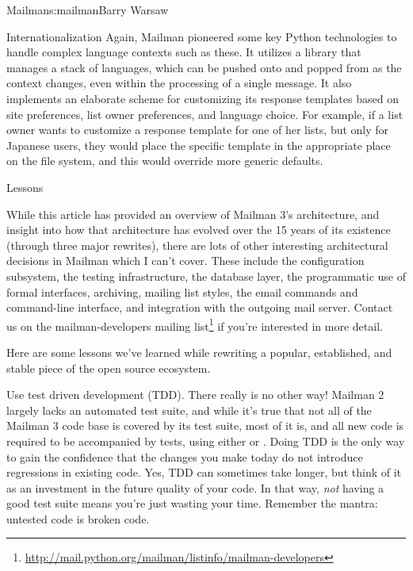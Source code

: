 \begin{aosachapter}{Mailman}{s:mailman}{Barry Warsaw}
\begin{aosasect1}{Internationalization}
Again, Mailman pioneered some key Python technologies to handle
complex language contexts such as these.  It utilizes a library that
manages a stack of languages, which can be pushed onto and popped from
as the context changes, even within the processing of a single
message.  It also implements an elaborate scheme for customizing its
response templates based on site preferences, list owner preferences,
and language choice.  For example, if a list owner wants to customize
a response template for one of her lists, but only for Japanese users,
they would place the specific template in the appropriate place on the
file system, and this would override more generic defaults.

\end{aosasect1}

\begin{aosasect1}{Lessons}

While this article has provided an overview of Mailman 3's
architecture, and insight into how that architecture has evolved over
the 15 years of its existence (through three major rewrites), there
are lots of other interesting architectural decisions in Mailman which
I can't cover.  These include the configuration subsystem, the testing
infrastructure, the database layer, the programmatic use of formal
interfaces, archiving, mailing list styles, the email commands and
command-line interface, and integration with the outgoing mail server.
Contact us on the mailman-developers mailing
list\footnote{\url{http://mail.python.org/mailman/listinfo/mailman-developers}}
if you're interested in more detail.

Here are some lessons we've learned while rewriting a popular,
established, and stable piece of the open source ecosystem.

\begin{aosaitemize}

\item Use test driven development (TDD).  There really is no other
  way!  Mailman 2 largely lacks an automated test suite, and while
  it's true that not all of the Mailman 3 code base is covered by its
  test suite, most of it is, and all new code is required to be
  accompanied by tests, using either  or
  .  Doing TDD is the only way to gain the confidence
  that the changes you make today do not introduce regressions in
  existing code.  Yes, TDD can sometimes take longer, but think of it
  as an investment in the future quality of your code.  In that way,
  \emph{not} having a good test suite means you're just wasting your
  time.  Remember the mantra: untested code is broken code.


\end{aosaitemize}
\end{aosasect1}
\end{aosachapter}

